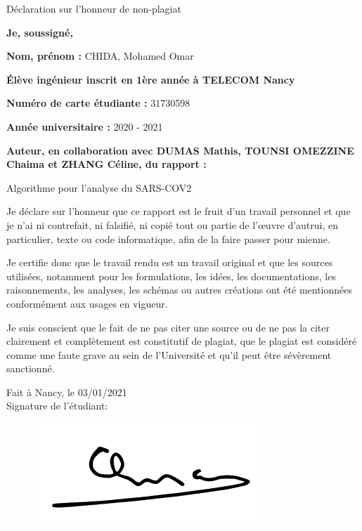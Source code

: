 

%

\begin{center}
\LARGE
    Déclaration sur l'honneur de non-plagiat
\end{center}					 


\textbf{Je, soussigné,} 

\textbf{Nom, prénom :} CHIDA, Mohamed Omar 

\textbf{Élève ingénieur inscrit en 1ère année à TELECOM Nancy} 

\textbf{Numéro de carte étudiante :} 31730598 

\textbf{Année universitaire :} 2020 - 2021 

\textbf{Auteur, en collaboration avec DUMAS Mathis, TOUNSI OMEZZINE Chaima et ZHANG Céline, du rapport : } 

\begin{center}
\Large
    Algorithme pour l'analyse du SARS-COV2 
\end{center}


Je déclare sur l’honneur que ce rapport est le fruit d’un travail personnel et que je n’ai ni contrefait, ni falsifié, ni copié tout ou partie de l’œuvre d’autrui, en particulier, texte ou code informatique, afin de la faire passer pour mienne.

Je certifie donc que le travail rendu est un travail original et que les sources utilisées, notamment pour les formulations, les idées, les documentations, les raisonnements, les analyses, les schémas ou autres créations ont été mentionnées conformément aux usages en vigueur.

Je suis conscient que le fait de ne pas citer une source ou de ne pas la citer clairement et complètement est constitutif de plagiat, que le plagiat est considéré comme une faute grave au sein de l’Université et qu’il peut être sévèrement sanctionné. \\


\begin{flushright}
Fait à Nancy, le 03/01/2021 \\
Signature de l'étudiant:
\end{flushright}
\begin{figure}[!h]
    \begin{flushright}
        \includegraphics[scale=0.65]{Images/Intro/Signatures/omarr.png}
    \end{flushright}
\end{figure}

